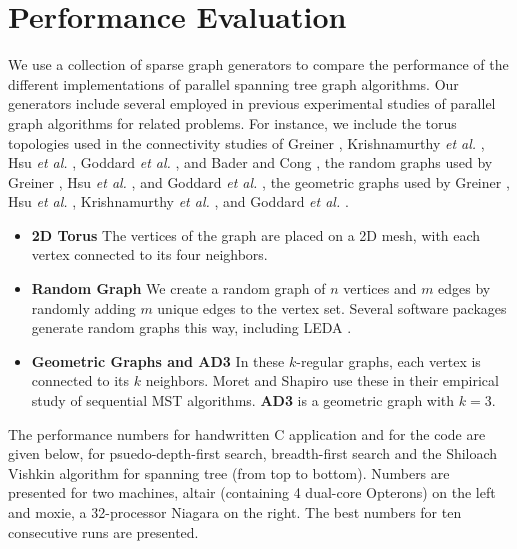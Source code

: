 \section{Performance Evaluation}\label{s:results}

We use a collection of sparse graph generators to compare the performance of the different implementations of 
parallel spanning tree graph algorithms. Our generators include several employed in previous
experimental studies of parallel graph algorithms for related
problems. For instance, we include the torus topologies used in the connectivity studies of Greiner
\cite{Gre94}, Krishnamurthy \emph{et al.} \cite{KLC97}, Hsu \emph{et
  al.} \cite{HRD97}, Goddard \emph{et al.} \cite{GKP97}, and Bader and Cong \cite{BC04b}, the
random graphs used by Greiner \cite{Gre94}, Hsu \emph{et al.}  \cite{HRD97}, and Goddard \emph{et
  al.} \cite{GKP97}, the geometric graphs used by
Greiner \cite{Gre94}, Hsu \emph{et al.} \cite{HRD97}, Krishnamurthy
\emph{et al.} \cite{KLC97}, and Goddard \emph{et al.} \cite{GKP97}.

\begin{itemize}
\itemsep0pt

\item \textbf{2D Torus} The vertices of the graph are placed on a 2D
  mesh, with each vertex connected to its four neighbors.  

\item \textbf{Random Graph} We create a random graph of $n$ vertices
  and $m$ edges by randomly adding $m$ unique edges to the vertex
  set. Several software packages generate random graphs this way,
  including LEDA \cite{MN99}.
  
\item \textbf{Geometric Graphs and AD3} In these $k$-regular graphs,
  each vertex is connected to its $k$ %
  neighbors.  Moret and Shapiro \cite{MS94} use these
  in their empirical study of sequential MST algorithms. \textbf{AD3}
  is a geometric graph with $k=3$.  
\end{itemize}


The performance numbers for handwritten C application and for the
\XWS{} code are given below, for psuedo-depth-first search,
breadth-first search and the Shiloach Vishkin algorithm for spanning
tree (from top to bottom). Numbers are presented for two machines,
altair (containing 4 dual-core Opterons) on the left and moxie, a
32-processor Niagara on the right. The best numbers for ten
consecutive runs are presented.

